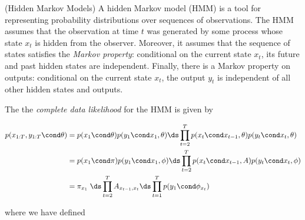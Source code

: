 \documentclass{article} %
\newcommand{\state}{x}
\begin{document}
\begin{example}{(Hidden Markov Models)} 
A  hidden Markov model (HMM) is a tool for representing probability distributions over sequences of observations.  The HMM assumes that the observation at time $t$ was generated by some process whose state $\state_t$ is hidden from the observer.  Moreover, it assumes that the sequence of states satisfies the \textit{Markov property}:  conditional on the current state $\state_t$, its future and past hidden states are independent.  Finally, there is a Markov property on outputs:  conditional on the current state $\state_t$, the output $y_t$ is independent of all other hidden states and outputs.

%
%
 
The the \textit{complete data likelihood} for the HMM is given by

\begin{align}
 p(\state_{1:T}, y_{1:T} \cond \theta) &=  p(\state_1 \cond \theta)  p(y_1 \cond \state_1, \theta) \ds\prod_{t=2}^T p(\state_t \cond \state_{t-1}, \theta) p(y_t \cond \state_t, \theta) \nonumber \\
 &=  p(\state_1 \cond \pi) p(y_1 \cond \state_1, \phi) \ds\prod_{t=2}^T p(\state_t \cond \state_{t-1}, A) p(y_t \cond \state_t, \phi)   \nonumber \\
 &= \pi_{\state_1}  \; \ds\prod_{t=2}^T A_{\state_{t-1}, \state_t} \ds\prod_{t=1}^T p(y_1 \cond \phi_{\state_t}) \label{eqn:hmm_cdl_compact}
 \end{align}
 
where we have defined 


\end{example}
\end{document}
